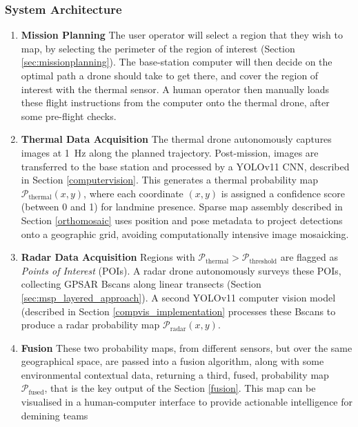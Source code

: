

    \subsubsection{System Architecture} \label{compvis_methods}
    
        \begin{enumerate}
        
            \item \textbf{Mission Planning} The user operator will select a region that they wish to map, by selecting the perimeter of the region of interest (Section \ref{sec:missionplanning}). The base-station computer will then decide on the optimal path a drone should take to get there, and cover the region of interest with the thermal sensor. A human operator then manually loads these flight instructions from the computer onto the thermal drone, after some pre-flight checks.
            
            \item \textbf{Thermal Data Acquisition} The thermal drone autonomously captures images at 1~Hz along the planned trajectory. Post-mission, images are transferred to the base station and processed by a YOLOv11 CNN, described in Section \ref{computervision}. This generates a thermal probability map \(\mathcal{P}_{\text{thermal}}(x,y)\), where each coordinate \((x,y)\) is assigned a confidence score (between 0 and 1) for landmine presence. Sparse map assembly described in Section \ref{orthomosaic} uses position and pose metadata to project detections onto a geographic grid, avoiding computationally intensive image mosaicking.
            
            \item \textbf{Radar Data Acquisition} Regions with \(\mathcal{P}_{\text{thermal}} > \mathcal{P}_{\text{threshold}}\) are flagged as \textit{Points of Interest} (POIs). A radar drone autonomously surveys these POIs, collecting GPSAR Bscans along linear transects (Section \ref{sec:msp_layered_approach}). A second YOLOv11 computer vision model (described in Section \ref{compvis_implementation} processes these Bscans to produce a radar probability map \(\mathcal{P}_{\text{radar}}(x,y)\).
            
            \item \textbf{Fusion} These two probability maps, from different sensors, but over the same geographical space, are passed into a fusion algorithm, along with some environmental contextual data, returning a third, fused, probability map $\mathcal{P}_{\text{fused}}$, that is the key output of the Section \ref{fusion}. This map can be visualised in a human-computer interface to provide actionable intelligence for demining teams
            
        \end{enumerate}


